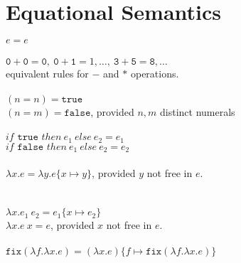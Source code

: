 \documentclass{westhesis}
\begin{document}
\section{Equational Semantics}
$e = e$ \\ \\
$\texttt{0} + \texttt{0} = \texttt{0}, \ \texttt{0} + \texttt{1} = 1, \ldots, \ \texttt{3} + \texttt{5} = \texttt{8}, \ldots$  \\
equivalent rules for $-$ and $*$ operations.
\\ \\
$(n =n) = \texttt{true}$ \\ $(n=m) = \texttt{false}$, provided $n, m$ distinct numerals \\ \\ 
$if \texttt{ true } then \ e_1 \ else \ e_2 = e_1$ \\
$if \texttt{ false } then \ e_1 \ else \ e_2 = e_2$ \\ \\ 
$\lambda x.e = \lambda y.e\{x \mapsto y \}$, provided $y$ not free in $e$. \\ \\ \\
$\lambda x.e_1 \ e_2 = e_1\{x \mapsto e_2\}$ \\
$\lambda x.e \ x = e$, provided $x$ not free in $e$. \\ \\
$\texttt{fix}(\lambda f. \lambda x.e) = (\lambda x.e)\{f \mapsto \texttt{fix}(\lambda f.\lambda x.e)\}$
\end{document}
